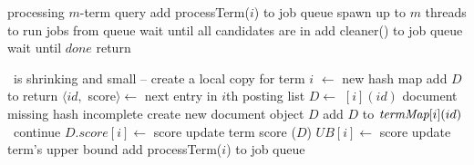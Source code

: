 
\begin{algorithm*}[tbh]
\small
\begin{multicols}{2}
\begin{algorithmic}[1]
 \Comment processing $m$-term query
\State add {\sc processTerm($i$)} to job queue \label{l:par-init-job}
\EndFor
\State spawn up to $m$  threads to run jobs from queue\label{l:start-threads}
\State wait until \RAStop
	\Comment all candidates  are in \DMap
\State add {\sc cleaner()} to job queue %
\State wait until $done$
\State return \DHeap \label{l:par-end}
%

\Statex 
{} 
	\If{\RAStop\, $\wedge\, |\DMap | < \Phi \, \wedge\  \TMap[i]=\DMap$} \label{l:hash-start}
			\Statex \Comment  \DMap\  is shrinking and small -- create a local copy for term $i$
			\State \TMap[i] $\leftarrow$ new hash map
    			 \label{l:hash-chash-loop}
            			\State add $D$ to \TMap[i] \label{l:hash-chash}
            		\EndFor
	\EndIf \label{l:hash-end}
		 return \EndIf
    		\State $\langle id,$ score$\rangle \leftarrow$ next entry in $i$th posting list
		\State $D \leftarrow$ \TMap$[i](id)$
 	  		 \Comment document missing 
 	  			\If{$\neg$\RAStop} \Comment hash incomplete
		 			\State create new document object $D$
 					\State add $D$ to $\textit{termMap}[i](id)$
				\Else\ continue
				\EndIf
    			\EndIf
        			\State $D.score[i] \leftarrow$ score \Comment update term  score
				($D$)
			\EndIf	
	\EndFor %
	\State $UB[i] \leftarrow$ score \Comment update term's upper bound \label{l:thread-update-ub}    
	\State add {\sc processTerm($i$)} to job queue \label{l:new-task}
\EndProcedure


\end{algorithmic}
\end{multicols}
\end{algorithm*}
